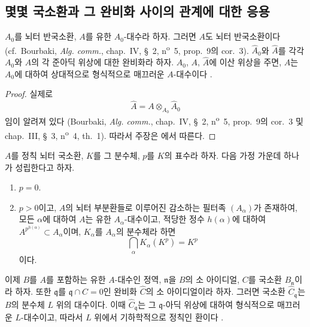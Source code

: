 
\subsection{몇몇 국소환과 그 완비화 사이의 관계에 대한 응용}
\label{subsection:0.22.3-ko}

\begin{lemma}[22.3.1]
\label{0.22.3.1-ko}
$A_0$를 뇌터 반국소환, $A$를 유한 $A_0$-대수라 하자. 그러면 $A$도
뇌터 반국소환이다 (cf.~Bourbaki, \emph{Alg. comm.}, chap.~IV, §~2,
n\textsuperscript{o}~5, prop.~9의 cor.~3). $\widehat A_0$와
$\widehat A$를 각각 $A_0$와 $A$의 각 준아딕 위상에 대한 완비화라 하자.
$A_0$, $A$, $\widehat A$에 이산 위상을 주면, $\widehat A$는
$A_0$에 대하여 상대적으로 형식적으로 매끄러운 $A$-대수이다
.
\end{lemma}

\begin{proof}
실제로
\[
  \widehat A=A\otimes_{A_0}\widehat A_0
\]
임이 알려져 있다 (Bourbaki, \emph{Alg. comm.}, chap.~IV, §~2,
n\textsuperscript{o}~5, prop.~9의 cor.~3 및 chap.~III, §~3,
n\textsuperscript{o}~4, th.~1). 따라서 주장은 에서
따른다.
\end{proof}

\begin{proposition}[22.3.2]
\label{0.22.3.2-ko}
$A$를 정칙 뇌터 국소환, $K$를 그 분수체, $p$를 $K$의 표수라 하자.
다음 가정 가운데 하나가 성립한다고 하자.
\begin{enumerate}
  \item[(i)] $p=0$.
  \item[(ii)] $p>0$이고, $A$의 뇌터 부분환들로 이루어진 감소하는 필터족
  $(A_\alpha)$가 존재하여, 모든 $\alpha$에 대하여 $A$는 유한
  $A_\alpha$-대수이고, 적당한 정수 $h(\alpha)$에 대하여
  $A^{p^{h(\alpha)}}\subset A_\alpha$이며, $K_\alpha$를
  $A_\alpha$의 분수체라 하면
  \[
    \bigcap_\alpha K_\alpha(K^p)=K^p
  \]
  이다.
\end{enumerate}
이제 $B$를 $A$를 포함하는 유한 $A$-대수인 정역,
$\mathfrak n$을 $B$의 소 아이디얼, $C$를 국소환 $B_\mathfrak n$이라
하자. 또한 $\mathfrak q$를
$\mathfrak q\cap C=0$인 완비화 $\widehat C$의 소 아이디얼이라 하자.
그러면 국소환 $\widehat C_\mathfrak q$는 $B$의 분수체 $L$ 위의
대수이다. 이때 $\widehat C_\mathfrak q$는 그 $\mathfrak q$-아딕 위상에
대하여 형식적으로 매끄러운 $L$-대수이고, 따라서 $L$ 위에서
기하학적으로 정칙인 환이다 .
\end{proposition}

